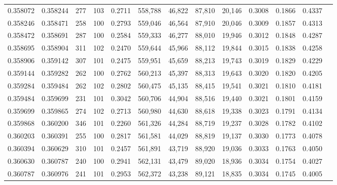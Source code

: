\begin{tabular}{rrrrrrrrrrrrr}
0.358072 & 0.358244 &   277 & 103 &                                     0.2711 & 558,788 &  46,822 &  87,810 &  20,146 & 0.3008 & 0.1866 & 0.4337 \\
0.358246 & 0.358471 &   258 & 100 &                                     0.2793 & 559,046 &  46,564 &  87,910 &  20,046 & 0.3009 & 0.1857 & 0.4313 \\
0.358472 & 0.358691 &   287 & 100 &                                     0.2584 & 559,333 &  46,277 &  88,010 &  19,946 & 0.3012 & 0.1848 & 0.4287 \\
0.358695 & 0.358904 &   311 & 102 &                                     0.2470 & 559,644 &  45,966 &  88,112 &  19,844 & 0.3015 & 0.1838 & 0.4258 \\
0.358906 & 0.359142 &   307 & 101 &                                     0.2475 & 559,951 &  45,659 &  88,213 &  19,743 & 0.3019 & 0.1829 & 0.4229 \\
0.359144 & 0.359282 &   262 & 100 &                                     0.2762 & 560,213 &  45,397 &  88,313 &  19,643 & 0.3020 & 0.1820 & 0.4205 \\
0.359284 & 0.359484 &   262 & 102 &                                     0.2802 & 560,475 &  45,135 &  88,415 &  19,541 & 0.3021 & 0.1810 & 0.4181 \\
0.359484 & 0.359699 &   231 & 101 &                                     0.3042 & 560,706 &  44,904 &  88,516 &  19,440 & 0.3021 & 0.1801 & 0.4159 \\
0.359699 & 0.359865 &   274 & 102 &                                     0.2713 & 560,980 &  44,630 &  88,618 &  19,338 & 0.3023 & 0.1791 & 0.4134 \\
0.359868 & 0.360200 &   346 & 101 &                                     0.2260 & 561,326 &  44,284 &  88,719 &  19,237 & 0.3028 & 0.1782 & 0.4102 \\
0.360203 & 0.360391 &   255 & 100 &                                     0.2817 & 561,581 &  44,029 &  88,819 &  19,137 & 0.3030 & 0.1773 & 0.4078 \\
0.360394 & 0.360629 &   310 & 101 &                                     0.2457 & 561,891 &  43,719 &  88,920 &  19,036 & 0.3033 & 0.1763 & 0.4050 \\
0.360630 & 0.360787 &   240 & 100 &                                     0.2941 & 562,131 &  43,479 &  89,020 &  18,936 & 0.3034 & 0.1754 & 0.4027 \\
0.360787 & 0.360976 &   241 & 101 &                                     0.2953 & 562,372 &  43,238 &  89,121 &  18,835 & 0.3034 & 0.1745 & 0.4005 \\

\end{tabular}
